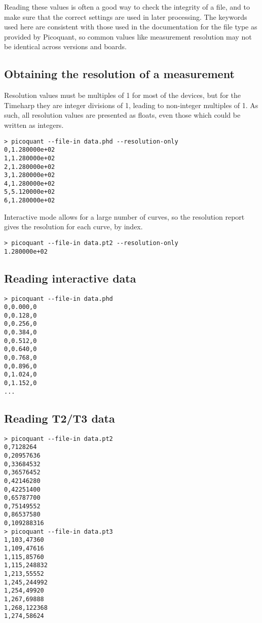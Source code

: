 \documentclass{article}
\begin{document}
Reading these values is often a good way to check the integrity of a file, and to make sure that the correct settings are used in later processing. The keywords used here are consistent with those used in the documentation for the file type as provided by Picoquant, so common values like measurement resolution may not be identical across versions and boards. 

\subsection{Obtaining the resolution of a measurement}
Resolution values must be multiples of 1\pico\second{} for most of the devices, but for the Timeharp they are integer divisions of 1\nano\second, leading to non-integer multiples of 1\pico\second. As such, all resolution values are presented as floats, even those which could be written as integers.
\begin{verbatim}
> picoquant --file-in data.phd --resolution-only
0,1.280000e+02
1,1.280000e+02
2,1.280000e+02
3,1.280000e+02
4,1.280000e+02
5,5.120000e+02
6,1.280000e+02
\end{verbatim}
Interactive mode allows for a large number of curves, so the resolution report gives the resolution for each curve, by index.
\begin{verbatim}
> picoquant --file-in data.pt2 --resolution-only
1.280000e+02
\end{verbatim}

\subsection{Reading interactive data}
\begin{verbatim}
> picoquant --file-in data.phd
0,0.000,0
0,0.128,0
0,0.256,0
0,0.384,0
0,0.512,0
0,0.640,0
0,0.768,0
0,0.896,0
0,1.024,0
0,1.152,0
...
\end{verbatim}

\subsection{Reading T2/T3 data}
\begin{verbatim}
> picoquant --file-in data.pt2
0,7128264
0,20957636
0,33684532
0,36576452
0,42146280
0,42251400
0,65787700
0,75149552
0,86537580
0,109288316
> picoquant --file-in data.pt3
1,103,47360
1,109,47616
1,115,85760
1,115,248832
1,213,55552
1,245,244992
1,254,49920
1,267,69888
1,268,122368
1,274,58624
\end{verbatim}
\end{document}

